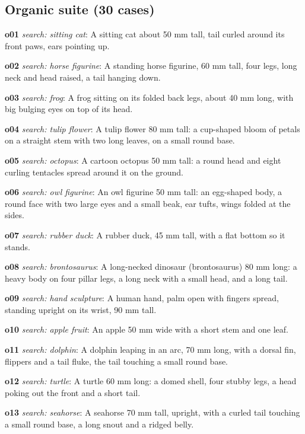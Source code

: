 \subsection*{Organic suite (30 cases)}
{\small
\noindent\textbf{o01} \emph{search: sitting cat}: A sitting cat about 50 mm tall, tail curled around its front paws, ears pointing up.\par
\noindent\textbf{o02} \emph{search: horse figurine}: A standing horse figurine, 60 mm tall, four legs, long neck and head raised, a tail hanging down.\par
\noindent\textbf{o03} \emph{search: frog}: A frog sitting on its folded back legs, about 40 mm long, with big bulging eyes on top of its head.\par
\noindent\textbf{o04} \emph{search: tulip flower}: A tulip flower 80 mm tall: a cup-shaped bloom of petals on a straight stem with two long leaves, on a small round base.\par
\noindent\textbf{o05} \emph{search: octopus}: A cartoon octopus 50 mm tall: a round head and eight curling tentacles spread around it on the ground.\par
\noindent\textbf{o06} \emph{search: owl figurine}: An owl figurine 50 mm tall: an egg-shaped body, a round face with two large eyes and a small beak, ear tufts, wings folded at the sides.\par
\noindent\textbf{o07} \emph{search: rubber duck}: A rubber duck, 45 mm tall, with a flat bottom so it stands.\par
\noindent\textbf{o08} \emph{search: brontosaurus}: A long-necked dinosaur (brontosaurus) 80 mm long: a heavy body on four pillar legs, a long neck with a small head, and a long tail.\par
\noindent\textbf{o09} \emph{search: hand sculpture}: A human hand, palm open with fingers spread, standing upright on its wrist, 90 mm tall.\par
\noindent\textbf{o10} \emph{search: apple fruit}: An apple 50 mm wide with a short stem and one leaf.\par
\noindent\textbf{o11} \emph{search: dolphin}: A dolphin leaping in an arc, 70 mm long, with a dorsal fin, flippers and a tail fluke, the tail touching a small round base.\par
\noindent\textbf{o12} \emph{search: turtle}: A turtle 60 mm long: a domed shell, four stubby legs, a head poking out the front and a short tail.\par
\noindent\textbf{o13} \emph{search: seahorse}: A seahorse 70 mm tall, upright, with a curled tail touching a small round base, a long snout and a ridged belly.\par
}
